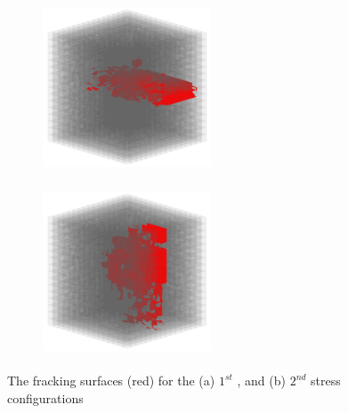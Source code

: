 \begin{figure}[!ht]
\begin{subfigure}[c]{0.48\textwidth}
\centering
\includegraphics[width=5cm,height=5cm]{figures/Amir_ME2_B_Fracture_a.png}
\subcaption{}
\label{fig:Amir_ME2_B_Fracture_a}
\end{subfigure}
\hfill
\begin{subfigure}[c]{0.48\textwidth}
\centering
\includegraphics[width=5cm,height=5cm]{figures/Amir_ME2_B_Fracture_b.png}
\subcaption{}
\label{fig:Amir_ME2_B_Fracture_b}
\end{subfigure}
\caption{The fracking surfaces (red) for the (a) $1^{st}$ , and (b) $2^{nd}$ stress configurations}
\end{figure}




